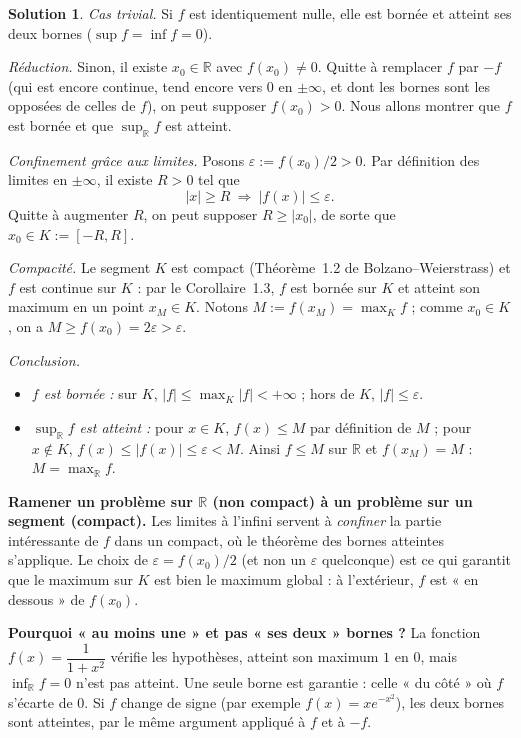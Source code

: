 \documentclass[11pt,a4paper]{article}
\newcommand{\R}{\mathbb{R}}
\theoremstyle{definition}
\newtheorem*{solution}{Solution}
\begin{document}
\begin{solution}
\emph{Cas trivial.} Si $f$ est identiquement nulle, elle est bornée et atteint ses deux bornes ($\sup f=\inf f=0$).

\emph{Réduction.} Sinon, il existe $x_0\in\R$ avec $f(x_0)\ne0$. Quitte à remplacer $f$ par $-f$ (qui est encore continue, tend encore vers $0$ en $\pm\infty$, et dont les bornes sont les opposées de celles de $f$), on peut supposer $f(x_0)>0$. Nous allons montrer que $f$ est bornée et que $\sup_\R f$ est atteint.

\emph{Confinement grâce aux limites.} Posons $\varepsilon:=f(x_0)/2>0$. Par définition des limites en $\pm\infty$, il existe $R>0$ tel que
\[
|x|\ge R\ \Longrightarrow\ |f(x)|\le\varepsilon .
\]
Quitte à augmenter $R$, on peut supposer $R\ge|x_0|$, de sorte que $x_0\in K:=[-R,R]$.

\emph{Compacité.} Le segment $K$ est compact (Théorème~1.2 de Bolzano--Weierstrass) et $f$ est continue sur $K$ : par le Corollaire~1.3, $f$ est bornée sur $K$ et atteint son maximum en un point $x_M\in K$. Notons $M:=f(x_M)=\max_Kf$ ; comme $x_0\in K$, on a $M\ge f(x_0)=2\varepsilon>\varepsilon$.

\emph{Conclusion.}
\begin{itemize}
  \item \emph{$f$ est bornée :} sur $K$, $|f|\le\max_K|f|<+\infty$ ; hors de $K$, $|f|\le\varepsilon$.
  \item \emph{$\sup_\R f$ est atteint :} pour $x\in K$, $f(x)\le M$ par définition de $M$ ; pour $x\notin K$, $f(x)\le|f(x)|\le\varepsilon<M$. Ainsi $f\le M$ sur $\R$ et $f(x_M)=M$ : $M=\max_\R f$.
\end{itemize}
\end{solution}

\begin{pointcle}
\textbf{Ramener un problème sur $\R$ (non compact) à un problème sur un segment (compact).} Les limites à l'infini servent à \emph{confiner} la partie intéressante de $f$ dans un compact, où le théorème des bornes atteintes s'applique. Le choix de $\varepsilon=f(x_0)/2$ (et non un $\varepsilon$ quelconque) est ce qui garantit que le maximum sur $K$ est bien le maximum global : à l'extérieur, $f$ est « en dessous » de $f(x_0)$.
\end{pointcle}

\begin{piege}
\textbf{Pourquoi « au moins une » et pas « ses deux » bornes ?} La fonction $f(x)=\dfrac{1}{1+x^2}$ vérifie les hypothèses, atteint son maximum $1$ en $0$, mais $\inf_\R f=0$ n'est pas atteint. Une seule borne est garantie : celle « du côté » où $f$ s'écarte de $0$. Si $f$ change de signe (par exemple $f(x)=x e^{-x^2}$), les deux bornes sont atteintes, par le même argument appliqué à $f$ et à $-f$.
\end{piege}
\end{document}
